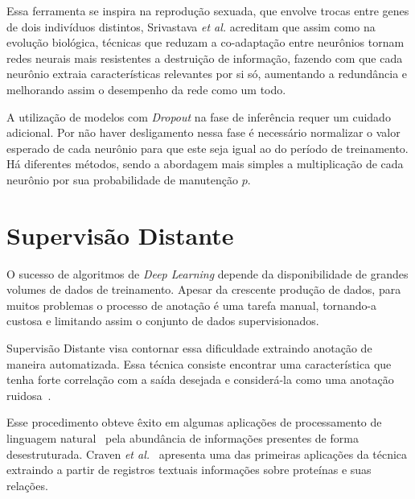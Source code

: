 Essa ferramenta se inspira na reprodução sexuada, que envolve trocas entre genes de dois indivíduos distintos, Srivastava \textit{et al.} acreditam que assim como na evolução biológica, técnicas que reduzam a co-adaptação entre neurônios tornam redes neurais mais resistentes a destruição de informação, fazendo com que cada neurônio extraia características relevantes por si só, aumentando a redundância e melhorando assim o desempenho da rede como um todo.

A utilização de modelos com \textit{Dropout} na fase de inferência requer um cuidado adicional. Por não haver desligamento nessa fase é necessário normalizar o valor esperado de cada neurônio para que este seja igual ao do período de treinamento. Há diferentes métodos, sendo a abordagem mais simples a multiplicação de cada neurônio por sua probabilidade de manutenção $p$.

\section{Supervisão Distante} \label{sec:distant_supervision}

O sucesso de algoritmos de \textit{Deep Learning} depende da disponibilidade de grandes volumes de dados de treinamento. Apesar da crescente produção de dados, para muitos problemas o processo de anotação é uma tarefa manual, tornando-a custosa e limitando assim o conjunto de dados supervisionados.

Supervisão Distante visa contornar essa dificuldade extraindo anotação de maneira automatizada. Essa técnica consiste encontrar uma característica que tenha forte correlação com a saída desejada e considerá-la como uma anotação ruidosa~\cite{go09}.

Esse procedimento obteve êxito em algumas aplicações de processamento de linguagem natural~\cite{craven99}\cite{go09} pela abundância de informações presentes de forma desestruturada. Craven \textit{et al.}~\cite{craven99} apresenta uma das primeiras aplicações da técnica extraindo a partir de registros textuais informações sobre proteínas e suas relações.
